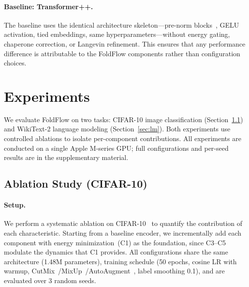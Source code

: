 \documentclass[10pt]{article}
\begin{document}
\paragraph{Baseline: Transformer++.}
The baseline uses the identical architecture skeleton---pre-norm
blocks~\citep{ba2016layer},
GELU activation, tied embeddings, same hyperparameters---without energy
gating, chaperone correction, or Langevin refinement.  This ensures that
any performance difference is attributable to the FoldFlow components
rather than configuration choices.

\section{Experiments}
\label{sec:experiments}

We evaluate FoldFlow on two tasks: CIFAR-10 image classification
(Section~\ref{sec:ablation}) and WikiText-2 language modeling
(Section~\ref{sec:lm}).  Both experiments use controlled ablations to
isolate per-component contributions.  All experiments are conducted on a
single Apple M-series GPU; full configurations and per-seed results are
in the supplementary material.

\subsection{Ablation Study (CIFAR-10)}
\label{sec:ablation}

\paragraph{Setup.}
We perform a systematic ablation on CIFAR-10~\citep{krizhevsky2009cifar}
to quantify the contribution of each characteristic.  Starting from a
baseline encoder, we incrementally add each component with energy
minimization~(C1) as the foundation, since C3--C5 modulate the dynamics
that C1 provides.  All configurations share the same architecture
(1.48M parameters), training schedule (50 epochs, cosine LR with warmup,
CutMix~\citep{yun2019cutmix}/MixUp~\citep{zhang2018mixup}/AutoAugment~\citep{cubuk2020randaugment},
label smoothing 0.1), and are evaluated over 3 random seeds.
\end{document}
